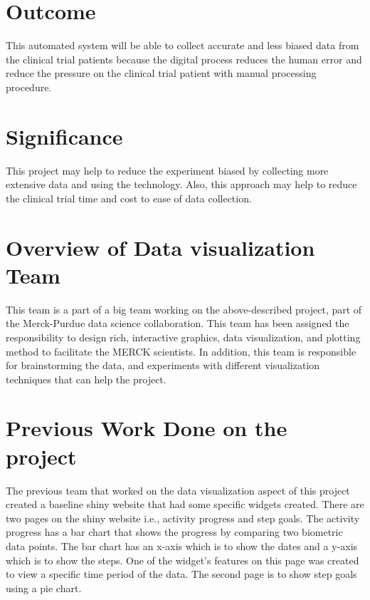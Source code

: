 \documentclass[]{book}
\begin{document}
\hypertarget{outcome}{%
\section{Outcome}\label{outcome}}

This automated system will be able to collect accurate and less biased data from the clinical trial patients because the digital process reduces the human error and reduce the pressure on the clinical trial patient with manual processing procedure.

\hypertarget{significance}{%
\section{Significance}\label{significance}}

This project may help to reduce the experiment biased by collecting more extensive data and using the technology. Also, this approach may help to reduce the clinical trial time and cost to ease of data collection.

\hypertarget{overview-of-data-visualization-team}{%
\section{Overview of Data visualization Team}\label{overview-of-data-visualization-team}}

This team is a part of a big team working on the above-described project, part of the Merck-Purdue data science collaboration. This team has been assigned the responsibility to design rich, interactive graphics, data visualization, and plotting method to facilitate the MERCK scientists. In addition, this team is responsible for brainstorming the data, and experiments with different visualization techniques that can help the project.

\hypertarget{previous-work-done-on-the-project}{%
\section{Previous Work Done on the project}\label{previous-work-done-on-the-project}}

The previous team that worked on the data visualization aspect of this project created a baseline shiny website that had some specific widgets created. There are two pages on the shiny website i.e., activity progress and step goals. The activity progress has a bar chart that shows the progress by comparing two biometric data points. The bar chart has an x-axis which is to show the dates and a y-axis which is to show the steps. One of the widget's features on this page was created to view a specific time period of the data. The second page is to show step goals using a pie chart.
\end{document}

